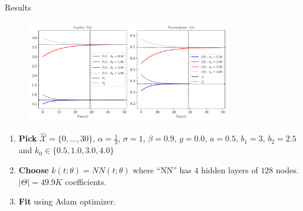 \documentclass[aspectratio=169,10pt]{beamer}
\newcommand{\emphcolor}[1]{\textbf{\textcolor{emphcolorval}{#1}}}
\newcommand{\Xtrain}{\hat{\mathcal{X}}}
\begin{document}
\begin{frame}{Results}
	\begin{figure}[htb]
		\centering
		\includegraphics[width=9cm]{./figures/growth_multiple_steady_states_four_initial_k_0.pdf}
	\end{figure}
	
	\begin{enumerate}
		\item \emphcolor{Pick} $\Xtrain =\{0,\ldots,30\}$, $\alpha=\frac{1}{3}$, $\sigma =1$, $\beta = 0.9$, $g = 0.0$, $a= 0.5$, $b_1 = 3$, $b_2 = 2.5$ and $k_0 \in\{0.5,1.0,3.0,4.0\}$
		\item \emphcolor{Choose} $k(t;\theta) = NN(t;\theta)$ where ``NN'' has $4$ hidden layers of $128$ nodes. $|\Theta| = 49.9 K$ coefficients.
		\item \emphcolor{Fit} using Adam optimizer.
	\end{enumerate}
\end{frame}
\end{document}
